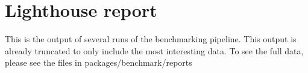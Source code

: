 \chapter{Lighthouse report} %

\label{lighthouse-report}

This is the output of several runs of the benchmarking pipeline.
This output is already truncated to only include the most interesting data.
To see the full data, please see the files in packages/benchmark/reports


